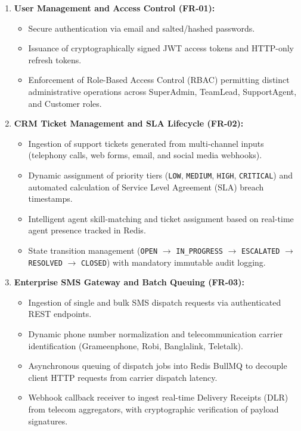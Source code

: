 \begin{enumerate}
    \item \textbf{User Management and Access Control (FR-01):}
    \begin{itemize}
        \item Secure authentication via email and salted/hashed passwords.
        \item Issuance of cryptographically signed JWT access tokens and HTTP-only refresh tokens.
        \item Enforcement of Role-Based Access Control (RBAC) permitting distinct administrative operations across SuperAdmin, TeamLead, SupportAgent, and Customer roles.
    \end{itemize}
    \item \textbf{CRM Ticket Management and SLA Lifecycle (FR-02):}
    \begin{itemize}
        \item Ingestion of support tickets generated from multi-channel inputs (telephony calls, web forms, email, and social media webhooks).
        \item Dynamic assignment of priority tiers (\texttt{LOW}, \texttt{MEDIUM}, \texttt{HIGH}, \texttt{CRITICAL}) and automated calculation of Service Level Agreement (SLA) breach timestamps.
        \item Intelligent agent skill-matching and ticket assignment based on real-time agent presence tracked in Redis.
        \item State transition management (\texttt{OPEN} $\to$ \texttt{IN\_PROGRESS} $\to$ \texttt{ESCALATED} $\to$ \texttt{RESOLVED} $\to$ \texttt{CLOSED}) with mandatory immutable audit logging.
    \end{itemize}
    \item \textbf{Enterprise SMS Gateway and Batch Queuing (FR-03):}
    \begin{itemize}
        \item Ingestion of single and bulk SMS dispatch requests via authenticated REST endpoints.
        \item Dynamic phone number normalization and telecommunication carrier identification (Grameenphone, Robi, Banglalink, Teletalk).
        \item Asynchronous queuing of dispatch jobs into Redis BullMQ to decouple client HTTP requests from carrier dispatch latency.
        \item Webhook callback receiver to ingest real-time Delivery Receipts (DLR) from telecom aggregators, with cryptographic verification of payload signatures.
    \end{itemize}
\end{enumerate}

